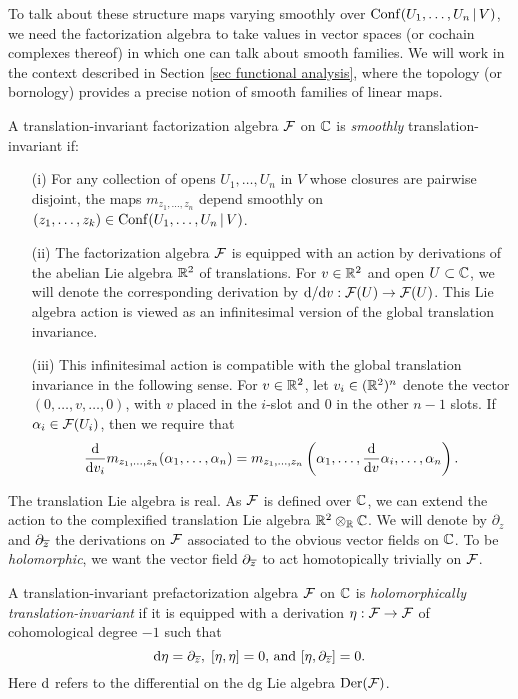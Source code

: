 To talk about these structure maps varying smoothly over ${\rm Conf}(U_1,\ldots,U_n \,|\, V)$, 
we need the factorization algebra to take values in vector spaces (or cochain complexes thereof) 
in which one can talk about smooth families.
We will work in the context described in Section \ref{sec functional analysis}, 
where the topology (or bornology) provides a precise notion of smooth families of linear maps.

\begin{dfn}
A translation-invariant factorization algebra $\mathcal F$ on $\mathbb C$ is {\em smoothly} translation-invariant 
if: 
\begin{enumerate}
\item[(i)] For any collection of opens $U_1,\ldots,U_n$ in $V$ whose closures are pairwise disjoint, 
the maps $m_{z_1,\dots,z_n}$ depend smoothly on $(z_1,\dots,z_k) \in {\rm Conf}(U_1,\ldots,U_n \,|\, V)$.
\item[(ii)] The factorization algebra $\mathcal F$ is equipped with an action by derivations of the abelian Lie algebra $\mathbb R^2$ of translations. 
For $v \in \mathbb R^2$ and open $U \subset \mathbb C$, we will denote the corresponding derivation by ${\rm d}/{\rm d} v : \mathcal F(U) \to \mathcal F(U)$.
This Lie algebra action is viewed as an infinitesimal version of the global translation invariance.
\item[(iii)] This infinitesimal action is compatible with the global translation invariance in the following sense. 
For $v \in \mathbb R^2$, let $v_i \in (\mathbb R^2)^n$ denote the vector $(0,\ldots,v,\ldots,0)$, with $v$ placed in the $i$-slot and $0$ in the other $n-1$ slots.  If $\alpha_i \in \mathcal F(U_i)$, then we require that
$$
\frac{{\rm d}}{{\rm d} v_i} m_{z_1,\dots,z_n} (\alpha_1,\dots,\alpha_n) = m_{z_1,\dots,z_n}\left(\alpha_1,\dots,\frac{{\rm d}}{{\rm d} v} \alpha_i, \dots, \alpha_n\right).
$$
\end{enumerate}  
\end{dfn}

The translation Lie algebra is real. 
As $\mathcal F$ is defined over $\mathbb C$, we can extend the action to the complexified translation Lie algebra $\mathbb R^{2} \otimes_{\mathbb R} \mathbb C$.  
We will denote by $\partial_z$ and $\partial_{\overline{z}}$ the derivations on $\mathcal F$ associated to the obvious vector fields on $\mathbb C$.
To be {\em holomorphic}, we want the vector field $\partial_{\overline{z}}$ to act homotopically trivially on $\mathcal F$.

\begin{dfn}\label{holomorphically_translation_invariant_definition}
A translation-invariant prefactorization algebra $\mathcal F$ on $\mathbb C$ is \emph{holomorphically translation-invariant} 
if it is equipped with a derivation $\eta: \mathcal F \to \mathcal F$ of cohomological degree $-1$ such that
\[ 
{\rm d} \eta = \partial_{\overline{z}}, \; [\eta,\eta] = 0,\,\text{and}\,  \left[ \eta,  \partial_{\overline{z}}  \right] = 0. 
\]
Here ${\rm d}$ refers to the differential on the dg Lie algebra ${\rm Der}(\mathcal F)$.
\end{dfn}

